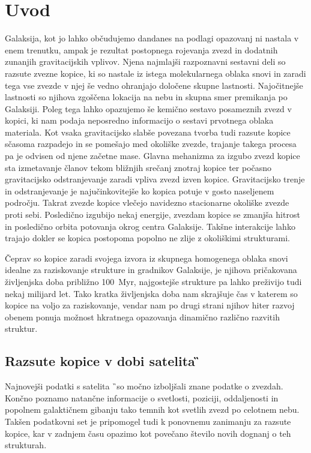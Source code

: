 
\section{Uvod}
\label{sec:slo_uvod}
Galaksija, kot jo lahko občudujemo dandanes na podlagi opazovanj ni nastala v enem trenutku, ampak je rezultat postopnega rojevanja zvezd in dodatnih zunanjih gravitacijskih vplivov. Njena najmlajši razpoznavni sestavni deli so razsute zvezne kopice, ki so nastale iz istega molekularnega oblaka snovi in zaradi tega vse zvezde v njej še vedno ohranjajo določene skupne lastnosti. Najočitnejše lastnosti so njihova zgoščena lokacija na nebu in skupna smer premikanja po Galaksiji. Poleg tega lahko opazujemo še kemično sestavo posameznih zvezd v kopici, ki nam podaja neposredno informacijo o sestavi prvotnega oblaka materiala. Kot vsaka gravitacijsko slabše povezana tvorba tudi razsute kopice sčasoma razpadejo in se pomešajo med okoliške zvezde, trajanje takega procesa pa je odvisen od njene začetne mase. Glavna mehanizma za izgubo zvezd kopice sta izmetavanje članov tekom bližnjih srečanj znotraj kopice ter počasno gravitacijsko odstranjevanje zaradi vpliva zvezd izven kopice. Gravitacijsko trenje in odstranjevanje je najučinkovitejše ko kopica potuje v gosto naseljenem področju. Takrat zvezde kopice vlečejo navidezno stacionarne okoliške zvezde proti sebi. Posledično izgubijo nekaj energije, zvezdam kopice se zmanjša hitrost in posledično orbita potovanja okrog centra Galaksije. Takšne interakcije lahko trajajo dokler se kopica postopoma popolno ne zlije z okoliškimi strukturami.

Čeprav so kopice zaradi svojega izvora iz skupnega homogenega oblaka snovi idealne za raziskovanje strukture in gradnikov Galaksije, je njihova pričakovana življenjska doba približno 100~Myr, najgostejše strukture pa lahko preživijo tudi nekaj milijard let. Tako kratka življenjska doba nam skrajšuje čas v katerem so kopice na voljo za raziskovanje, vendar nam po drugi strani njihov hiter razvoj obenem ponuja možnost hkratnega opazovanja dinamično različno razvitih struktur.

\subsection{Razsute kopice v dobi satelita \G}
Najnovejši podatki s satelita \G\ so močno izboljšali znane podatke o zvezdah. Končno poznamo natančne informacije o svetlosti, poziciji, oddaljenosti in popolnem galaktičnem gibanju tako temnih kot svetlih zvezd po celotnem nebu. Takšen podatkovni set je pripomogel tudi k ponovnemu zanimanju za razsute kopice, kar v zadnjem času opazimo kot povečano število novih dognanj o teh strukturah.


